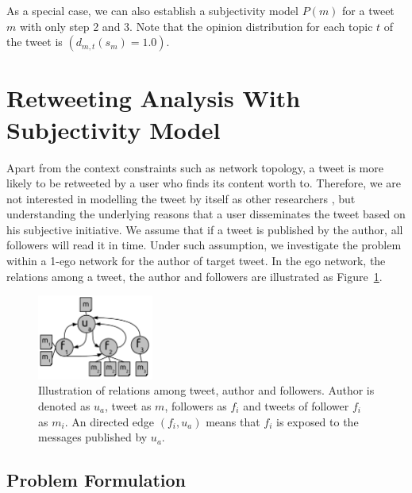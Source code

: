 \documentclass[letterpaper]{article}
\begin{document}
As a special case, we can also establish a subjectivity model $ P\left( m \right)  $ for a tweet $ m $ with only step 2 and 3. Note that the opinion distribution for each topic $ t $ of the tweet is $(d_{m,t}\left( s_{m}\right)= 1.0 )$. 

\section{Retweeting Analysis With Subjectivity Model}

Apart from the context constraints such as network topology, a tweet is more likely to be retweeted by a user who finds its content worth to. 
Therefore, we are not interested in modelling the tweet by itself as other researchers \cite{naveed2011searching,pfitzner2012emotional}, but understanding the underlying reasons that a user disseminates the tweet based on his subjective initiative. 
We assume that if a tweet is published by the author, all followers will read it in time. 
Under such assumption, we investigate the problem within a 1-ego network for the author of target tweet. 
In the ego network, the relations among a tweet, the author and followers are illustrated as Figure~\ref{fig1}.
\begin{figure}[htb]
\centering
\includegraphics[width=1.5in,height=1.1in]{ego.pdf}
\caption{Illustration of relations among tweet, author and followers. Author is denoted as $ u_{a} $, tweet as $ m $, followers as $ f_{i} $ and tweets of follower $ f_{i} $ as $ m_{i} $. An directed edge $ \left( f_{i},u_{a} \right)  $ means that $ f_{i} $ is exposed to the messages published by $ u_{a} $.}
\label{fig1}
\end{figure}

\subsection{Problem Formulation}
\label{formulation}
\end{document}
